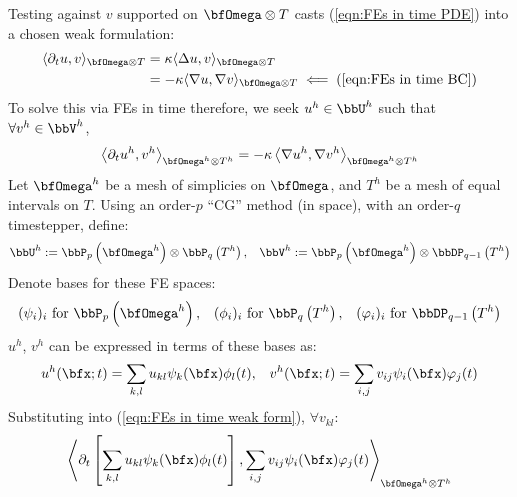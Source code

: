 \begin{example}
        Testing against $v$ supported on $\bfOmega\otimes T$ casts (\ref{eqn:FEs in time PDE}) into a chosen weak formulation:
        \begin{align}
            \langle\partial_{t}u, v\rangle_{\bfOmega\otimes T}  &=  \kappa\langle\Delta u, v\rangle_{\bfOmega\otimes T}  \\
                                                                &=   - \kappa\langle\nabla u, \nabla v\rangle_{\bfOmega\otimes T}  \impliedby  {\rm (\ref{eqn:FEs in time BC})}
        \end{align}
        To solve this via FEs in time therefore, we seek $u^{h}  \in  \bbU^{h}$ such that $\forall  v^{h}  \in  \bbV^{h}$,
        \begin{equation}\label{eqn:FEs in time weak form}
            \left\langle\partial_{t}u^{h}, v^{h}\right\rangle_{\bfOmega^{h}\otimes T^{h}}  =  - \kappa\left\langle\nabla u^{h}, \nabla v^{h}\right\rangle_{\bfOmega^{h}\otimes T^{h}}
        \end{equation}
        Let $\bfOmega^{h}$ be a mesh of simplicies on $\bfOmega$, and $T^{h}$ be a mesh of equal intervals on $T$. Using an order-$p$ ``CG'' method (in space), with an order-$q$ timestepper, define:
        \begin{align}
            \bbU^{h}  :=  \bbP_{p}\left(\bfOmega^{h}\right)\otimes\bbP_{q}\left(T^{h}\right),  &&
            \bbV^{h}  :=  \bbP_{p}\left(\bfOmega^{h}\right)\otimes\bbDP_{q - 1}\left(T^{h}\right)
        \end{align}
        Denote bases for these FE spaces:
        \begin{align}
            (\psi_{i})_{i}     \text{ for }  \bbP_{p}\left(\bfOmega^{h}\right),  &&
            (\phi_{i})_{i}     \text{ for }  \bbP_{q}\left(T^{h}\right),  &&
            (\varphi_{i})_{i}  \text{ for }  \bbDP_{q - 1}\left(T^{h}\right)
        \end{align}
        $u^{h}$, $v^{h}$ can be expressed in terms of these bases as:
        \begin{align}
            u^{h}(\bfx; t)  =  \sum_{k, l}u_{kl}\psi_{k}(\bfx)\phi_{l}(t),  &&
            v^{h}(\bfx; t)  =  \sum_{i, j}v_{ij}\psi_{i}(\bfx)\varphi_{j}(t)
        \end{align}
        Substituting into (\ref{eqn:FEs in time weak form}), $\forall  v_{kl}$:
        \begin{multline}
            \left\langle\partial_{t}\left[\sum_{k, l}u_{kl}\psi_{k}(\bfx)\phi_{l}(t)\right], \sum_{i, j}v_{ij}\psi_{i}(\bfx)\varphi_{j}(t)\right\rangle_{\bfOmega^{h}\otimes T^{h}}  \\

\end{multline}
\end{example}
